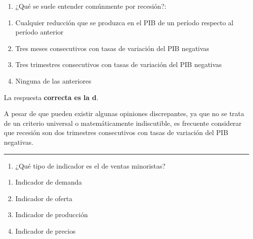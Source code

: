 \documentclass[
  letterpaper,
  DIV=11,
  numbers=noendperiod]{scrreprt}
\providecommand{\tightlist}{%
  \setlength{\itemsep}{0pt}\setlength{\parskip}{0pt}}\usepackage{longtable,booktabs,array}
\begin{document}
\begin{enumerate}
\def\labelenumi{\arabic{enumi}.}
\setcounter{enumi}{8}
\tightlist
\item
  ¿Qué se suele entender comúnmente por recesión?:
\end{enumerate}

\begin{enumerate}
\def\labelenumi{\alph{enumi})}
\item
  Cualquier reducción que se produzca en el PIB de un período respecto
  al período anterior
\item
  Tres meses consecutivos con tasas de variación del PIB negativas
\item
  Tres trimestres consecutivos con tasas de variación del PIB negativas
\item
  Ninguna de las anteriores
\end{enumerate}

\begin{tcolorbox}[enhanced jigsaw, left=2mm, opacityback=0, colback=white, breakable, arc=.35mm, bottomrule=.15mm, rightrule=.15mm, toprule=.15mm, leftrule=.75mm, colframe=quarto-callout-tip-color-frame]
\begin{minipage}[t]{5.5mm}
\textcolor{quarto-callout-tip-color}{\faLightbulb}
\end{minipage}%
\begin{minipage}[t]{\textwidth - 5.5mm}

La respuesta \textbf{correcta es la d}.

A pesar de que pueden existir algunas opiniones discrepantes, ya que no
se trata de un criterio universal o matemáticamente indiscutible, es
frecuente considerar que recesión son dos trimestres consecutivos con
tasas de variación del PIB negativas.

\end{minipage}%
\end{tcolorbox}

\begin{center}\rule{0.5\linewidth}{0.5pt}\end{center}

\begin{enumerate}
\def\labelenumi{\arabic{enumi}.}
\setcounter{enumi}{9}
\tightlist
\item
  ¿Qué tipo de indicador es el de ventas minoristas?
\end{enumerate}

\begin{enumerate}
\def\labelenumi{\alph{enumi})}
\item
  Indicador de demanda
\item
  Indicador de oferta
\item
  Indicador de producción
\item
  Indicador de precios
\end{enumerate}
\end{document}
